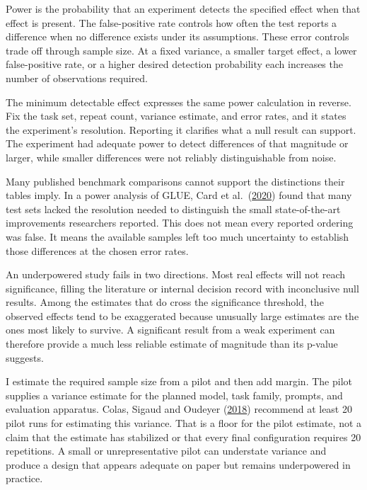 Power is the probability that an experiment detects the specified effect when that effect is present. The false-positive rate controls how often the test reports a difference when no difference exists under its assumptions. These error controls trade off through sample size. At a fixed variance, a smaller target effect, a lower false-positive rate, or a higher desired detection probability each increases the number of observations required.

The minimum detectable effect expresses the same power calculation in reverse. Fix the task set, repeat count, variance estimate, and error rates, and it states the experiment's resolution. Reporting it clarifies what a null result can support. The experiment had adequate power to detect differences of that magnitude or larger, while smaller differences were not reliably distinguishable from noise.

Many published benchmark comparisons cannot support the distinctions their tables imply. In a power analysis of GLUE, Card et al.~(\href{https://arxiv.org/abs/2010.06595}{2020}) found that many test sets lacked the resolution needed to distinguish the small state-of-the-art improvements researchers reported. This does not mean every reported ordering was false. It means the available samples left too much uncertainty to establish those differences at the chosen error rates.

An underpowered study fails in two directions. Most real effects will not reach significance, filling the literature or internal decision record with inconclusive null results. Among the estimates that do cross the significance threshold, the observed effects tend to be exaggerated because unusually large estimates are the ones most likely to survive. A significant result from a weak experiment can therefore provide a much less reliable estimate of magnitude than its p-value suggests.

I estimate the required sample size from a pilot and then add margin. The pilot supplies a variance estimate for the planned model, task family, prompts, and evaluation apparatus. Colas, Sigaud and Oudeyer (\href{https://arxiv.org/abs/1806.08295}{2018}) recommend at least 20 pilot runs for estimating this variance. That is a floor for the pilot estimate, not a claim that the estimate has stabilized or that every final configuration requires 20 repetitions. A small or unrepresentative pilot can understate variance and produce a design that appears adequate on paper but remains underpowered in practice.

